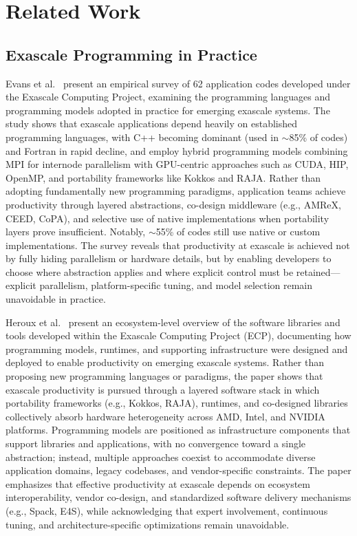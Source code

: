 
\section{Related Work}
\label{sec:related}

\subsection{Exascale Programming in Practice}

Evans et al.~\cite{Evans2022} present an empirical survey of 62 application codes developed
under the Exascale Computing Project, examining the programming languages and
programming models adopted in practice for emerging exascale systems. The study
shows that exascale applications depend heavily on established programming
languages, with C++ becoming dominant (used in $\sim$85\% of codes) and Fortran
in rapid decline, and employ hybrid programming models combining MPI for
internode parallelism with GPU-centric approaches such as CUDA, HIP, OpenMP,
and portability frameworks like Kokkos and RAJA. Rather than adopting
fundamentally new programming paradigms, application teams achieve productivity
through layered abstractions, co-design middleware (e.g., AMReX, CEED, CoPA),
and selective use of native implementations when portability layers prove
insufficient. Notably, $\sim$55\% of codes still use native or custom
implementations. The survey reveals that productivity at exascale is achieved
not by fully hiding parallelism or hardware details, but by enabling developers
to choose where abstraction applies and where explicit control must be
retained---explicit parallelism, platform-specific tuning, and model selection
remain unavoidable in practice.

Heroux et al.~\cite{heroux2020ecp} present an ecosystem-level overview of the
software libraries and tools developed within the Exascale Computing Project
(ECP), documenting how programming models, runtimes, and supporting
infrastructure were designed and deployed to enable productivity on emerging
exascale systems. Rather than proposing new programming languages or paradigms,
the paper shows that exascale productivity is pursued through a layered software
stack in which portability frameworks (e.g., Kokkos, RAJA), runtimes, and
co-designed libraries collectively absorb hardware heterogeneity across AMD,
Intel, and NVIDIA platforms. Programming models are positioned as infrastructure
components that support libraries and applications, with no convergence toward a
single abstraction; instead, multiple approaches coexist to accommodate diverse
application domains, legacy codebases, and vendor-specific constraints. The
paper emphasizes that effective productivity at exascale depends on ecosystem
interoperability, vendor co-design, and standardized software delivery
mechanisms (e.g., Spack, E4S), while acknowledging that expert involvement,
continuous tuning, and architecture-specific optimizations remain unavoidable.

